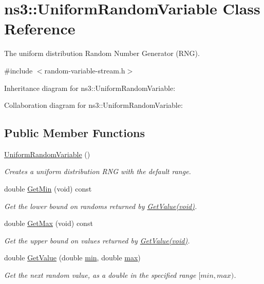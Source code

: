 \hypertarget{classns3_1_1UniformRandomVariable}{}\section{ns3\+:\+:Uniform\+Random\+Variable Class Reference}
\label{classns3_1_1UniformRandomVariable}


The uniform distribution Random Number Generator (R\+NG).  




{\ttfamily \#include $<$random-\/variable-\/stream.\+h$>$}



Inheritance diagram for ns3\+:\+:Uniform\+Random\+Variable\+:


Collaboration diagram for ns3\+:\+:Uniform\+Random\+Variable\+:
\subsection*{Public Member Functions}
\begin{DoxyCompactItemize}
\item 
\hyperlink{classns3_1_1UniformRandomVariable_a1615d3acd6f76293f3fdc7f7f66c68a5}{Uniform\+Random\+Variable} ()
\begin{DoxyCompactList}\small\item\em Creates a uniform distribution R\+NG with the default range. \end{DoxyCompactList}\item 
double \hyperlink{classns3_1_1UniformRandomVariable_af4eb895e8b31b635543f9e6680737b73}{Get\+Min} (void) const 
\begin{DoxyCompactList}\small\item\em Get the lower bound on randoms returned by \hyperlink{classns3_1_1RandomVariableStream_a4fa5944dc4cb11544e661ed23072b36c}{Get\+Value(void)}. \end{DoxyCompactList}\item 
double \hyperlink{classns3_1_1UniformRandomVariable_a58bec07858aab80e0f71ae4472a43c3e}{Get\+Max} (void) const 
\begin{DoxyCompactList}\small\item\em Get the upper bound on values returned by \hyperlink{classns3_1_1RandomVariableStream_a4fa5944dc4cb11544e661ed23072b36c}{Get\+Value(void)}. \end{DoxyCompactList}\item 
double \hyperlink{classns3_1_1UniformRandomVariable_a03822d8c86ac51e9aa83bbc73041386b}{Get\+Value} (double \hyperlink{80211b_8c_ac6afabdc09a49a433ee19d8a9486056d}{min}, double \hyperlink{80211b_8c_affe776513b24d84b39af8ab0930fef7f}{max})
\begin{DoxyCompactList}\small\item\em Get the next random value, as a double in the specified range $[min, max)$. \end{DoxyCompactList}\end{DoxyCompactItemize}
